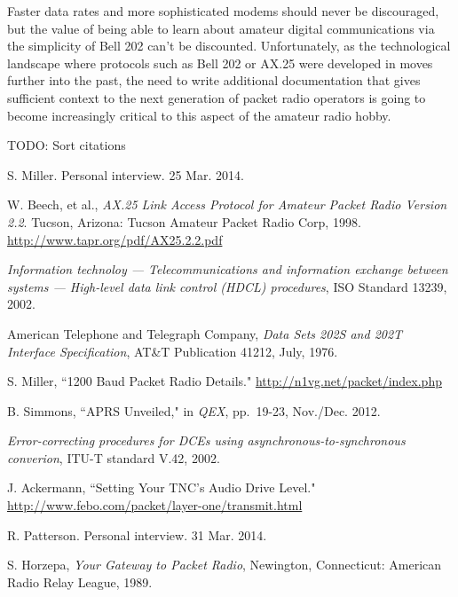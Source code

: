 \documentclass[12pt,letterpaper]{article}
\begin{document}
Faster data rates and more sophisticated modems should never be discouraged,
but the value of being able to learn about amateur digital communications 
via the simplicity of Bell 202 can't be discounted.
Unfortunately, as the technological landscape where 
protocols such as Bell 202 or AX.25 were developed in moves further into the past,
the need to write additional documentation that gives sufficient context to 
the next generation of packet radio operators is going to become increasingly 
critical to this aspect of the amateur radio hobby.


TODO: Sort citations

\begin{thebibliography}{99}

		S. Miller. Personal interview. 25 Mar. 2014.

		W. Beech, et al.,
		\emph{AX.25 Link Access Protocol for Amateur Packet Radio Version 2.2}.
		Tucson, Arizona: Tucson Amateur Packet Radio Corp, 1998. 
		\url{http://www.tapr.org/pdf/AX25.2.2.pdf}

		\emph{Information technoloy --- Telecommunications and information
			exchange between systems --- High-level data link control (HDCL)
		procedures}, ISO Standard 13239, 2002.

		American Telephone and Telegraph Company,
		\emph{Data Sets 202S and 202T Interface Specification},
		AT\&T Publication 41212,
		July, 1976.

		S. Miller,
		``1200 Baud Packet Radio Details."
		\url{http://n1vg.net/packet/index.php}

		B. Simmons,
		``APRS Unveiled," in \emph{QEX},
		pp.~19-23,
		Nov./Dec. 2012.

		\emph{Error-correcting procedures for DCEs using 
		asynchronous-to-synchronous converion}, ITU-T standard V.42, 2002.

		J. Ackermann,
		``Setting Your TNC's Audio Drive Level."
		\url{http://www.febo.com/packet/layer-one/transmit.html}

		R. Patterson. Personal interview. 31 Mar. 2014.

		S. Horzepa,
		\emph{Your Gateway to Packet Radio},
		Newington, Connecticut: American Radio Relay League, 1989.

\end{thebibliography}
\end{document}
